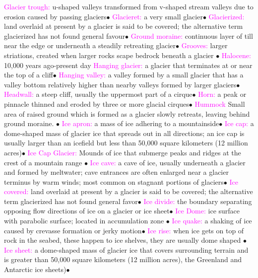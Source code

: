\documentclass{article}
\newcommand{\ddd}{$\bullet$}
\newcommand{\pink}[1]{\textcolor{magenta}{#1}}
\newcommand{\vocab}[1]{{\pink{#1}}}
\begin{document}
\begin{multicols*}{4}
		\vocab{        Glacier trough: } u-shaped valleys transformed from v-shaped stream valleys due to erosion caused by passing glaciers\ddd
		\vocab{        Glacieret: } a very small glacier\ddd
		\vocab{        Glacierized: } land overlaid at present by a glacier is said to be covered; the alternative term glacierized has not found general favour\ddd
		\vocab{        Ground moraine: } continuous layer of till near the edge or underneath a steadily retreating glacier\ddd
		\vocab{Grooves: } larger striations, created when larger rocks scape bedrock beneath a glacier \ddd
		\vocab{ Halocene: } 10,000 years ago-present day
		\vocab{        Hanging glacier: } a glacier that terminates at or near the top of a cliff\ddd
		\vocab{        Hanging valley: } a valley formed by a small glacier that has a valley bottom relatively higher than nearby valleys formed by larger glaciers\ddd
		\vocab{        Headwall: } a steep cliff, usually the uppermost part of a cirque\ddd
		\vocab{        Horn: } a peak or pinnacle thinned and eroded by three or more glacial cirques\ddd
		\vocab{Hummock} Small area of raised ground which is formed as a glacier slowly retreats, leaving behind ground moraine. \ddd
		\vocab{        Ice apron: } a mass of ice adhering to a mountainside\ddd
		\vocab{        Ice cap: } a dome-shaped mass of glacier ice that spreads out in all directions; an ice cap is usually larger than an icefield but less than 50,000 square kilometers (12 million acres)\ddd
		\vocab{Ice Cap Glacier: } Mounds of ice that submerge peaks and ridges at the crest of a mountain range \ddd
		\vocab{        Ice cave: } a cave of ice, usually underneath a glacier and formed by meltwater; cave entrances are often enlarged near a glacier terminus by warm winds; most common on stagnant portions of glaciers\ddd
		\vocab{        Ice covered: } land overlaid at present by a glacier is said to be covered; the alternative term glacierized has not found general favor\ddd
		\vocab{        Ice divide: } the boundary separating opposing flow directions of ice on a glacier or ice sheet\ddd
		\vocab{        Ice Dome: } ice surface with parabolic surface; located in accumulation zone \ddd 
		\vocab{        Ice quake: } a shaking of ice caused by crevasse formation or jerky motion\ddd
		\vocab{Ice rise: } when ice gets on top of rock in the seabed, these happen to ice shelves, they are usually dome shaped \ddd
		\vocab{        Ice sheet: } a dome-shaped mass of glacier ice that covers surrounding terrain and is greater than 50,000 square kilometers (12 million acres), the Greenland and Antarctic ice sheets)\ddd

\end{multicols*}
\end{document}

